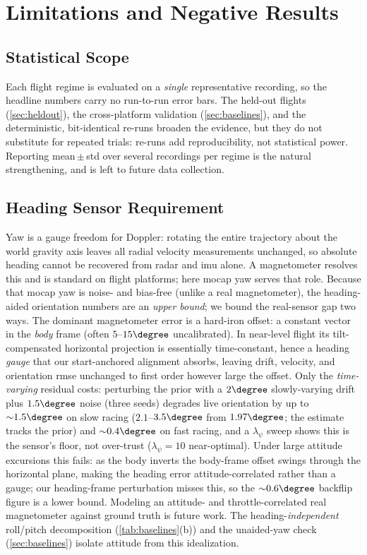 \section{Limitations and Negative Results}
\label{sec:limits}

\subsection{Statistical Scope}
\label{sec:stat_scope}
Each flight regime is evaluated on a \emph{single} representative
recording, so the headline numbers carry no run-to-run error bars.  The
held-out flights (\autoref{sec:heldout}), the cross-platform validation
(\autoref{sec:baselines}), and the deterministic, bit-identical re-runs
broaden the evidence, but they do not substitute for repeated trials:
re-runs add reproducibility, not statistical power.  Reporting
mean\,$\pm$\,std over several recordings per regime is the natural
strengthening, and is left to future data collection.

\subsection{Heading Sensor Requirement}
\label{sec:yaw}
Yaw is a gauge freedom for Doppler: rotating the entire trajectory
about the world gravity axis leaves all radial velocity measurements
unchanged, so absolute heading cannot be recovered from radar and \ac{imu}
alone.  A magnetometer resolves this and is standard on flight platforms;
here \ac{mocap} yaw serves that role.  Because that
\ac{mocap} yaw is noise- and bias-free (unlike a real magnetometer),
the heading-aided orientation numbers are an \emph{upper bound}; we bound
the real-sensor gap two ways.  The dominant magnetometer error is a hard-iron
offset: a constant vector in the \emph{body} frame (often $5$--$15\degree$
uncalibrated).  In near-level flight its tilt-compensated horizontal
projection is essentially time-constant, hence a heading \emph{gauge} that
our start-anchored alignment absorbs, leaving drift, velocity, and
orientation \ac{rmse} unchanged to first order however large the offset.
Only the \emph{time-varying} residual costs: perturbing the prior with a
$2\degree$ slowly-varying drift plus $1.5\degree$ noise (three seeds) degrades
live orientation by up to ${\sim}1.5\degree$ on slow racing ($2.1$--$3.5\degree$
from $1.97\degree$; the estimate tracks the prior) and ${\sim}0.4\degree$ on
fast racing, and a $\lambda_\psi$ sweep shows this is the sensor's floor, not
over-trust ($\lambda_\psi{=}10$ near-optimal).  Under large attitude
excursions this fails: as the body inverts the body-frame offset swings
through the horizontal plane, making the heading error attitude-correlated
rather than a gauge; our heading-frame perturbation misses this, so the
${\sim}0.6\degree$ backflip figure is a lower bound.  Modeling an attitude-
and throttle-correlated real magnetometer against ground truth is future
work.  The
heading-\emph{independent} roll/pitch decomposition
(\autoref{tab:baselines}(b)) and the unaided-yaw check (\autoref{sec:baselines})
isolate attitude from this idealization.

